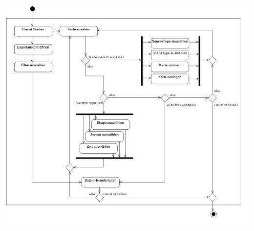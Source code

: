     \subsection{}
        \includegraphics[width=1\linewidth]{diagrams/ActivityDiagram1.png}

        